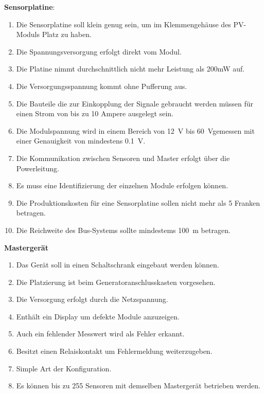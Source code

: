 \textbf{Sensorplatine}:
\begin{enumerate}
    \item
        Die Sensorplatine  soll klein  genug sein, um im  Klemmengeh\"ause des
        PV-Moduls Platz zu haben.
    \item
        Die Spannungsversorgung erfolgt direkt vom Modul.
    \item
        Die Platine nimmt durchschnittlich nicht mehr Leistung als 200mW auf.
    \item
        Die Versorgungsspannung kommt ohne Pufferung aus.
    \item
        Die Bauteile die zur Einkopplung der Signale gebraucht werden m\"ussen
        f\"ur einen Strom von bis zu 10 Ampere ausgelegt sein.
    \item
        Die   Modulspannung  wird   in   einem   Bereich  von   \SI{12}{\volt}
        bis  \SI{60}{\volt}gemessen  mit   einer  Genauigkeit  von  mindestens
        \SI{0.1}{\volt}.
    \item
        Die  Kommunikation zwischen  Sensoren  und Master  erfolgt \"uber  die
        Powerleitung.
    \item
        Es muss eine Identifizierung der einzelnen Module erfolgen k\"onnen.
    \item
        Die Produktionskosten f\"ur eine Sensorplatine sollen nicht mehr als 5
        Franken betragen.
    \item
        Die  Reichweite  des  Bus-Systems sollte  mindestems  \SI{100}{\meter}
        betragen.
\end{enumerate}

\textbf{Masterger\"at}
\begin{enumerate}
    \item
        Das Ger\"at soll in einen Schaltschrank eingebaut werden k\"onnen.
    \item
        Die Platzierung ist beim Generatoranschlusskasten vorgesehen.
    \item
        Die Versorgung erfolgt durch die Netzspannung.
    \item
        Enth\"alt ein Display um defekte Module anzuzeigen.
    \item
        Auch ein fehlender Messwert wird als Fehler erkannt.
    \item
        Besitzt einen Relaiskontakt um Fehlermeldung weiterzugeben.
    \item
        Simple Art der Konfiguration.
    \item
        Es k\"onnen bis zu 255  Sensoren mit demselben Masterger\"at betrieben
        werden.
\end{enumerate}


